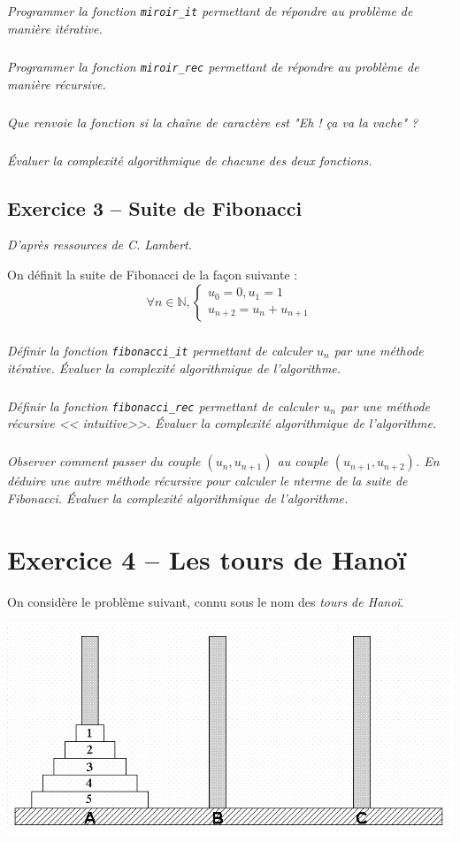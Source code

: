\subparagraph{}
\textit{Programmer la fonction \texttt{miroir\_it} permettant de répondre au problème de manière itérative.}


\subparagraph{}
\textit{Programmer la fonction \texttt{miroir\_rec} permettant de répondre au problème de manière récursive.}


\subparagraph{}
\textit{Que renvoie la fonction si la chaîne de caractère est "Eh ! ça va la vache" ?}
 
 \subparagraph{}
\textit{Évaluer la complexité algorithmique de chacune des deux fonctions.}

 
\subsection*{Exercice 3 -- Suite de Fibonacci}
\textit{D'après ressources de C. Lambert.}

\setcounter{subparagraph}{0}
On définit la suite de Fibonacci de la façon suivante : 
$$
\forall n\in \mathbb{N}, \left\{ \begin{array}{l}
u_0 = 0, u_1 = 1 \\
u_{n+2} = u_{n} + u_{n+1}
\end{array}\right.
$$

\subparagraph{}
\textit{Définir la fonction \texttt{fibonacci\_it} permettant de calculer $u_n$ par une méthode itérative. Évaluer la 
complexité algorithmique de l'algorithme.}

\subparagraph{}
\textit{Définir la fonction \texttt{fibonacci\_rec} permettant de calculer $u_n$ par une méthode récursive << 
intuitive>>. Évaluer la complexité algorithmique de l'algorithme.}


\subparagraph{}
\textit{Observer comment passer du couple $(u_n,u_{n+1})$ au couple $(u_{n+1},u_{n+2})$. En déduire une autre méthode 
récursive pour calculer le n\ieme terme de la suite de Fibonacci. Évaluer la complexité algorithmique de l'algorithme.}


\section*{Exercice 4 -- Les tours de Hanoï}
\setcounter{subparagraph}{0}

On considère le problème suivant, connu sous le nom des \emph{tours de Hanoï}.

\begin{center}
\includegraphics[scale=0.3]{images/hanoi.png}
\end{center}

